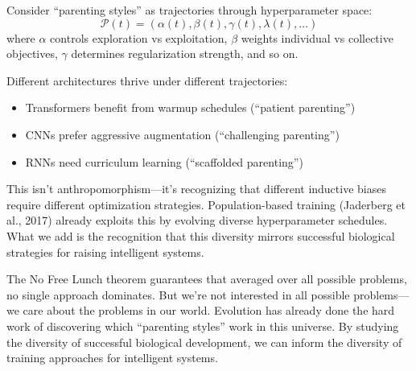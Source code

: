 Consider ``parenting styles'' as trajectories through hyperparameter space:
\begin{equation}
\mathcal{P}(t) = (\alpha(t), \beta(t), \gamma(t), \lambda(t), \ldots)
\end{equation}
where $\alpha$ controls exploration vs exploitation, $\beta$ weights individual vs collective objectives, $\gamma$ determines regularization strength, and so on.

Different architectures thrive under different trajectories:
\begin{itemize}
\item Transformers benefit from warmup schedules (``patient parenting'')
\item CNNs prefer aggressive augmentation (``challenging parenting'')
\item RNNs need curriculum learning (``scaffolded parenting'')
\end{itemize}

This isn't anthropomorphism---it's recognizing that different inductive biases require different optimization strategies.
Population-based training (Jaderberg et al., 2017) already exploits this by evolving diverse hyperparameter schedules.
What we add is the recognition that this diversity mirrors successful biological strategies for raising intelligent systems.

The No Free Lunch theorem guarantees that averaged over all possible problems, no single approach dominates.
But we're not interested in all possible problems---we care about the problems in our world.
Evolution has already done the hard work of discovering which ``parenting styles'' work in this universe.
By studying the diversity of successful biological development, we can inform the diversity of training approaches for intelligent systems.